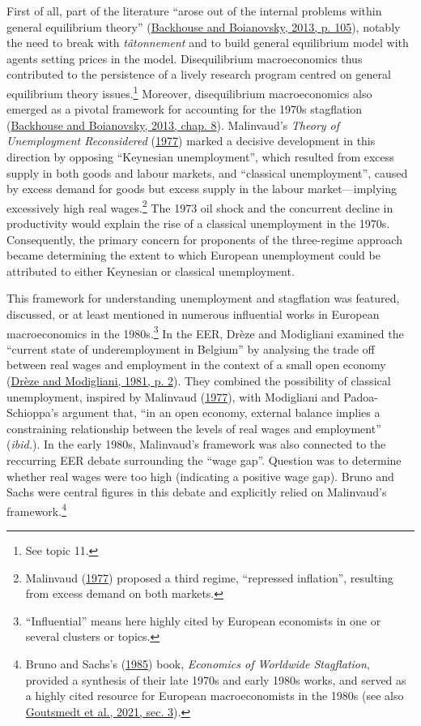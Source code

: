 \documentclass[
  12pt,
  onecolumn]{article}
\begin{document}
First of all, part of the literature ``arose out of the internal problems within general equilibrium theory'' (\protect\hyperlink{ref-backhouseboianovski2013}{Backhouse and Boianovsky, 2013, p. 105}), notably the need to break with \emph{tâtonnement} and to build general equilibrium model with agents setting prices in the model. Disequilibrium macroeconomics thus contributed to the persistence of a lively research program centred on general equilibrium theory issues.\footnote{See topic 11.} Moreover, disequilibrium macroeconomics also emerged as a pivotal framework for accounting for the 1970s stagflation (\protect\hyperlink{ref-backhouseboianovski2013}{Backhouse and Boianovsky, 2013, chap. 8}). Malinvaud's \emph{Theory of Unemployment Reconsidered} (\protect\hyperlink{ref-malinvaud1977}{1977}) marked a decisive development in this direction by opposing ``Keynesian unemployment'', which resulted from excess supply in both goods and labour markets, and ``classical unemployment'', caused by excess demand for goods but excess supply in the labour market---implying excessively high real wages.\footnote{Malinvaud (\protect\hyperlink{ref-malinvaud1977}{1977}) proposed a third regime, ``repressed inflation'', resulting from excess demand on both markets.} The 1973 oil shock and the concurrent decline in productivity would explain the rise of a classical unemployment in the 1970s. Consequently, the primary concern for proponents of the three-regime approach became determining the extent to which European unemployment could be attributed to either Keynesian or classical unemployment.

This framework for understanding unemployment and stagflation was featured, discussed, or at least mentioned in numerous influential works in European macroeconomics in the 1980s.\footnote{``Influential'' means here highly cited by European economists in one or several clusters or topics.} In the EER, Drèze and Modigliani examined the ``current state of underemployment in Belgium'' by analysing the trade off between real wages and employment in the context of a small open economy (\protect\hyperlink{ref-dreze1981}{Drèze and Modigliani, 1981, p. 2}). They combined the possibility of classical unemployment, inspired by Malinvaud (\protect\hyperlink{ref-malinvaud1977}{1977}), with Modigliani and Padoa-Schioppa's argument that, ``in an open economy, external balance implies a constraining relationship between the levels of real wages and employment'' (\emph{ibid.}). In the early 1980s, Malinvaud's framework was also connected to the reccurring EER debate surrounding the ``wage gap''. Question was to determine whether real wages were too high (indicating a positive wage gap). Bruno and Sachs were central figures in this debate and explicitly relied on Malinvaud's framework.\footnote{Bruno and Sachs's (\protect\hyperlink{ref-brunosachs1985}{1985}) book, \emph{Economics of Worldwide Stagflation}, provided a synthesis of their late 1970s and early 1980s works, and served as a highly cited resource for European macroeconomists in the 1980s (see also \protect\hyperlink{ref-goutsmedt2021}{Goutsmedt et al., 2021, sec. 3}).}
\end{document}

